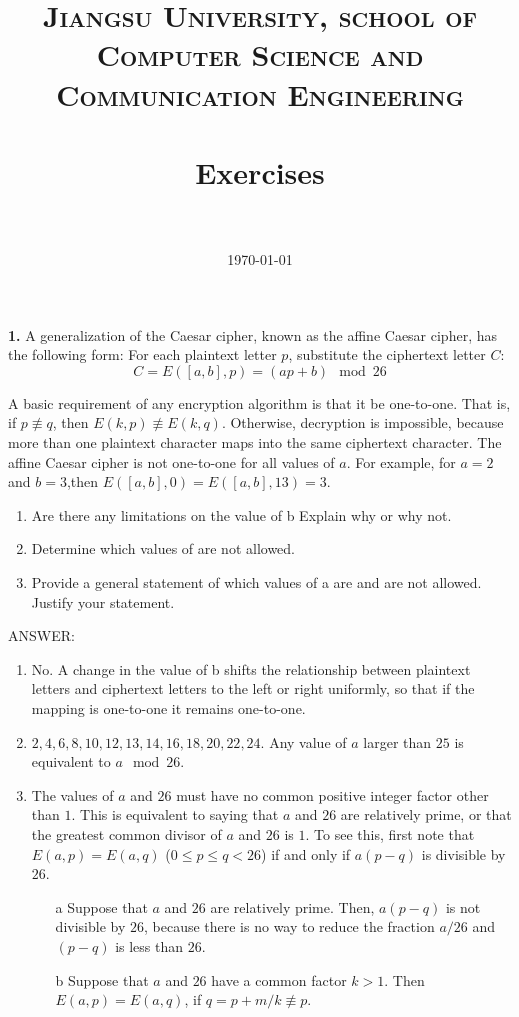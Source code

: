 \documentclass[paper=a4, fontsize=11pt]{scrartcl} %
\title{ 
\normalfont \normalsize
\textsc{Jiangsu University, school of Computer Science and Communication Engineering} \\ [25pt] %
\horrule{2pt} \\[0.4cm] %
\huge Exercises \\ %
\horrule{0.5pt} \\[0.5cm] %
}
\date{\normalsize\today} %
\numberwithin{equation}{section} %
\numberwithin{figure}{section} %
\numberwithin{table}{section} %
\begin{document}
\maketitle %


\textbf{1.} A generalization of the Caesar cipher, known as the affine Caesar cipher, has the following form: For each plaintext letter $p$, substitute the ciphertext letter $C$:
$$C = E([a, b], p) = (ap + b) \mod 26$$

A basic requirement of any encryption algorithm is that it be
one-to-one. That is, if $p\not\equiv q$, then $E(k,p)\not\equiv E(k,q)$. Otherwise, decryption is impossible, because more than one plaintext character maps into the same ciphertext character. The affine Caesar cipher is not one-to-one for all values of $a$. For example, for $a=2$ and $b=3$,then $E([a,b],0)=E([a,b],13)=3$.

\begin{enumerate}
\item Are there any limitations on the value of b Explain why or why not.
\item Determine which values of are not allowed.
\item Provide a general statement of which values of a are and are not allowed. Justify your statement.
\end{enumerate}

ANSWER:

\begin{enumerate}
\item No. A change in the value of b shifts the relationship between
  plaintext letters and ciphertext letters to the left or right
  uniformly, so that if the mapping is one-to-one it remains
  one-to-one.
\item $2,4,6,8,10,12,13,14,16,18,20,22,24$. Any value of $a$ larger than $25$ is equivalent to $a \mod 26$.
\item The values of $a$ and $26$ must have no common positive integer
  factor other than $1$. This is equivalent to saying that $a$ and $26$ are
  relatively prime, or that the greatest common divisor of $a$ and $26$ is
  $1$. To see this, first note that $E(a,p) = E(a,q)$ ($0\le p \le
  q<26$) if and only if $a(p-q)$ is divisible by $26$.
  \begin{enumerate}
  \item[a] Suppose that $a$ and $26$ are relatively prime. Then, $a(p-q)$ is not divisible by $26$, because there is no way to reduce the fraction $a/26$ and $(p-q)$ is less than $26$.
  \item[b] Suppose that $a$ and $26$ have a common factor $k>1$. Then
    $E(a,p)=E(a,q)$, if $q=p+m/k\not\equiv p$.
  \end{enumerate}
\end{enumerate}
\end{document}
